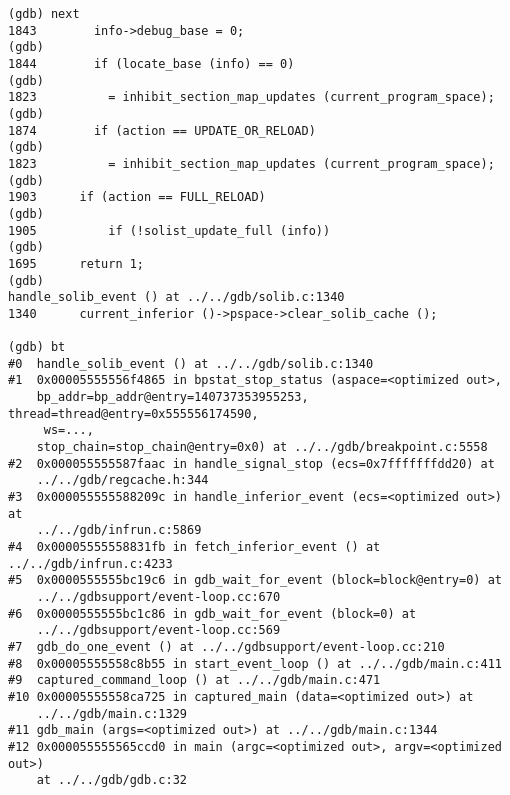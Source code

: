 \documentclass{report}
\begin{document}
\begin{verbatim}
(gdb) next
1843	    info->debug_base = 0;
(gdb) 
1844	    if (locate_base (info) == 0)
(gdb) 
1823	      = inhibit_section_map_updates (current_program_space);
(gdb) 
1874	    if (action == UPDATE_OR_RELOAD)
(gdb) 
1823	      = inhibit_section_map_updates (current_program_space);
(gdb) 
1903	  if (action == FULL_RELOAD)
(gdb) 
1905	      if (!solist_update_full (info))
(gdb) 
1695	  return 1;
(gdb) 
handle_solib_event () at ../../gdb/solib.c:1340
1340	  current_inferior ()->pspace->clear_solib_cache ();

(gdb) bt
#0  handle_solib_event () at ../../gdb/solib.c:1340
#1  0x00005555556f4865 in bpstat_stop_status (aspace=<optimized out>, 
    bp_addr=bp_addr@entry=140737353955253, thread=thread@entry=0x555556174590,
     ws=..., 
    stop_chain=stop_chain@entry=0x0) at ../../gdb/breakpoint.c:5558
#2  0x000055555587faac in handle_signal_stop (ecs=0x7fffffffdd20) at 
    ../../gdb/regcache.h:344
#3  0x000055555588209c in handle_inferior_event (ecs=<optimized out>) at 
    ../../gdb/infrun.c:5869
#4  0x00005555558831fb in fetch_inferior_event () at ../../gdb/infrun.c:4233
#5  0x0000555555bc19c6 in gdb_wait_for_event (block=block@entry=0) at 
    ../../gdbsupport/event-loop.cc:670
#6  0x0000555555bc1c86 in gdb_wait_for_event (block=0) at 
    ../../gdbsupport/event-loop.cc:569
#7  gdb_do_one_event () at ../../gdbsupport/event-loop.cc:210
#8  0x00005555558c8b55 in start_event_loop () at ../../gdb/main.c:411
#9  captured_command_loop () at ../../gdb/main.c:471
#10 0x00005555558ca725 in captured_main (data=<optimized out>) at 
    ../../gdb/main.c:1329
#11 gdb_main (args=<optimized out>) at ../../gdb/main.c:1344
#12 0x000055555565ccd0 in main (argc=<optimized out>, argv=<optimized out>) 
    at ../../gdb/gdb.c:32


\end{verbatim}
\end{document}
